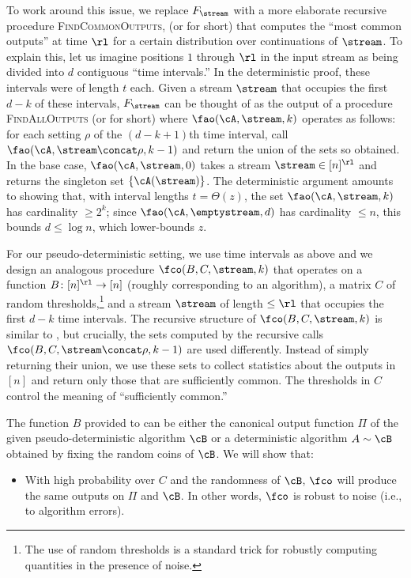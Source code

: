 \begin{itemize}
\begin{itemize}
To work around this issue, we replace $F_\stream$ with a more elaborate
recursive procedure \textsc{FindCommonOutputs}, (or \fco for short) that
computes the ``most common outputs'' at time $\rl$ for a certain distribution
over continuations of $\stream$. To explain this, let us imagine positions $1$
through $\rl$ in the input stream as being divided into $d$ contiguous ``time
intervals.'' In the deterministic proof, these intervals were of length $t$
each. Given a stream $\stream$ that occupies the first $d-k$ of these
intervals, $F_\stream$ can be thought of as the output of a procedure
\textsc{FindAllOutputs} (or \fao for short) where $\fao(\cA, \stream, k)$
operates as follows: for each setting $\rho$ of the $(d-k+1)$th time interval,
call $\fao(\cA, \stream \concat \rho, k-1)$ and return the union of the sets
so obtained. In the base case, $\fao(\cA, \stream, 0)$ takes a stream $\stream
\in [n]^\rl$ and returns the singleton set $\{\cA(\stream)\}$. The
deterministic argument amounts to showing that, with interval lengths $t =
\Theta(z)$, the set $\fao(\cA, \stream, k)$ has cardinality $\ge 2^k$; since
$\fao(\cA, \emptystream, d)$ has cardinality $\le n$, this bounds $d \le \log
n$, which lower-bounds $z$.

For our pseudo-deterministic setting, we use time intervals as above and we
design an analogous procedure $\fco(B, C, \stream, k)$ that operates on a
function $B \colon [n]^\rl \to [n]$ (roughly corresponding to an \mif
algorithm), a matrix $C$ of random thresholds,\footnote{The use of random
thresholds is a standard trick for robustly computing quantities in the
presence of noise.} and a stream $\stream$ of length $\le \rl$ that occupies
the first $d-k$ time intervals. The recursive structure of $\fco(B, C,
\stream, k)$ is similar to \fao, but crucially, the sets computed by the
recursive calls $\fco(B, C, \stream \concat \rho, k-1)$ are used differently.
Instead of simply returning their union, we use these sets to collect
statistics about the outputs in $[n]$ and return only those that are
sufficiently common. The thresholds in $C$ control the meaning of
``sufficiently common.''

The function $B$ provided to \fco can be either the canonical output function
$\Pi$ of the given pseudo-deterministic algorithm $\cB$ or a deterministic
algorithm $A \sim \cB$ obtained by fixing the random coins of $\cB$. We will
show that:
%
\begin{itemize}

  \item With high probability over $C$ and the randomness of $\cB$, $\fco$
  will produce the same outputs on $\Pi$ and $\cB$. In other words, $\fco$ is
  robust to noise (i.e., to algorithm errors).


\end{itemize}
\end{itemize}
\end{itemize}
